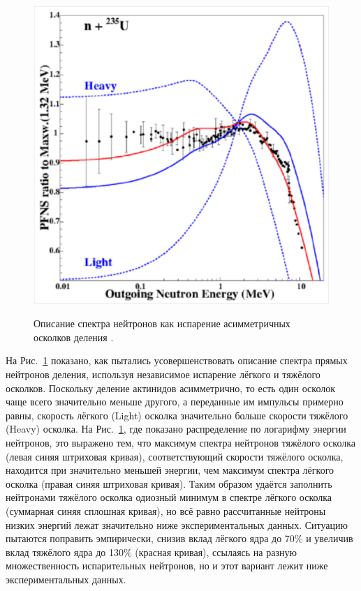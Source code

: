 \documentclass[a4paper,12pt]{article}
\begin{document}
\begin{large}
  \begin{figure}[ht]
    {
       \includegraphics[width=0.90\linewidth]{images/SpecLH}
    }
    \caption{Описание спектра нейтронов как испарение асимметричных осколков деления \cite{Capote16}.}
    \label{fig:USpecLH}
  \end{figure}
  На Рис.~\ref{fig:USpecLH} показано, как пытались усовершенствовать описание спектра прямых нейтронов деления, используя независимое испарение лёгкого и тяжёлого осколков.
  Поскольку деление актинидов асимметрично, то есть один осколок чаще всего значительно меньше другого, а переданные им импульсы примерно равны, скорость лёгкого (Light) осколка значительно больше скорости тяжёлого (Heavy) осколка.
  На Рис.~\ref{fig:USpecLH}, где показано распределение по логарифму энергии нейтронов, это выражено тем, что максимум спектра нейтронов тяжёлого осколка (левая синяя штриховая кривая), соответствующий скорости тяжёлого осколка, находится при значительно меньшей энергии, чем максимум спектра лёгкого осколка (правая синяя штриховая кривая).
  Таким образом удаётся заполнить нейтронами тяжёлого осколка одиозный минимум в спектре лёгкого осколка (суммарная синяя сплошная кривая), но всё равно рассчитанные нейтроны низких энергий лежат значительно ниже экспериментальных данных.
  Ситуацию пытаются поправить эмпирически, снизив вклад лёгкого ядра до 70\% и увеличив вклад тяжёлого ядра до 130\% (красная кривая), ссылаясь на разную множественность испарительных нейтронов, но и этот вариант лежит ниже экспериментальных данных.
  

\end{large}
\end{document}
